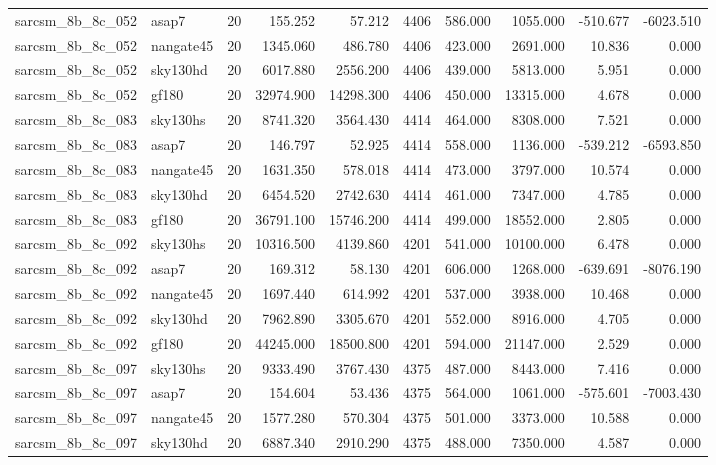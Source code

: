 \begin{longtable}{llrrrrrrrr}
sarcsm\_8b\_8c\_052 & asap7 & 20 & 155.252 & 57.212 & 4406 & 586.000 & 1055.000 & -510.677 & -6023.510 \\
sarcsm\_8b\_8c\_052 & nangate45 & 20 & 1345.060 & 486.780 & 4406 & 423.000 & 2691.000 & 10.836 & 0.000 \\
sarcsm\_8b\_8c\_052 & sky130hd & 20 & 6017.880 & 2556.200 & 4406 & 439.000 & 5813.000 & 5.951 & 0.000 \\
sarcsm\_8b\_8c\_052 & gf180 & 20 & 32974.900 & 14298.300 & 4406 & 450.000 & 13315.000 & 4.678 & 0.000 \\
sarcsm\_8b\_8c\_083 & sky130hs & 20 & 8741.320 & 3564.430 & 4414 & 464.000 & 8308.000 & 7.521 & 0.000 \\
sarcsm\_8b\_8c\_083 & asap7 & 20 & 146.797 & 52.925 & 4414 & 558.000 & 1136.000 & -539.212 & -6593.850 \\
sarcsm\_8b\_8c\_083 & nangate45 & 20 & 1631.350 & 578.018 & 4414 & 473.000 & 3797.000 & 10.574 & 0.000 \\
sarcsm\_8b\_8c\_083 & sky130hd & 20 & 6454.520 & 2742.630 & 4414 & 461.000 & 7347.000 & 4.785 & 0.000 \\
sarcsm\_8b\_8c\_083 & gf180 & 20 & 36791.100 & 15746.200 & 4414 & 499.000 & 18552.000 & 2.805 & 0.000 \\
sarcsm\_8b\_8c\_092 & sky130hs & 20 & 10316.500 & 4139.860 & 4201 & 541.000 & 10100.000 & 6.478 & 0.000 \\
sarcsm\_8b\_8c\_092 & asap7 & 20 & 169.312 & 58.130 & 4201 & 606.000 & 1268.000 & -639.691 & -8076.190 \\
sarcsm\_8b\_8c\_092 & nangate45 & 20 & 1697.440 & 614.992 & 4201 & 537.000 & 3938.000 & 10.468 & 0.000 \\
sarcsm\_8b\_8c\_092 & sky130hd & 20 & 7962.890 & 3305.670 & 4201 & 552.000 & 8916.000 & 4.705 & 0.000 \\
sarcsm\_8b\_8c\_092 & gf180 & 20 & 44245.000 & 18500.800 & 4201 & 594.000 & 21147.000 & 2.529 & 0.000 \\
sarcsm\_8b\_8c\_097 & sky130hs & 20 & 9333.490 & 3767.430 & 4375 & 487.000 & 8443.000 & 7.416 & 0.000 \\
sarcsm\_8b\_8c\_097 & asap7 & 20 & 154.604 & 53.436 & 4375 & 564.000 & 1061.000 & -575.601 & -7003.430 \\
sarcsm\_8b\_8c\_097 & nangate45 & 20 & 1577.280 & 570.304 & 4375 & 501.000 & 3373.000 & 10.588 & 0.000 \\
sarcsm\_8b\_8c\_097 & sky130hd & 20 & 6887.340 & 2910.290 & 4375 & 488.000 & 7350.000 & 4.587 & 0.000 \\

\end{longtable}
